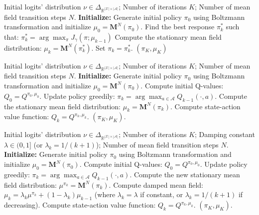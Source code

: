 \documentclass[10pt,twocolumn,letterpaper]{article}
\theoremstyle{definition}
\theoremstyle{remark}
\newcommand{\states}{\mathcal{X}}
\newcommand{\actions}{\mathcal{A}}
\begin{document}
\begin{algorithm}[H]
\small
\caption{Pure Fixed Point}
\label{algo:purefp}
\begin{algorithmic}[1]
    \REQUIRE Initial logits' distribution $\nu\in\Delta_{\mathbb{R}^{|\states|\times|\actions|}}$; Number of iterations $K$; Number of mean field transition steps $N$.
    \STATE \textbf{Initialize:} Generate initial policy $\pi_0$ using Boltzmann transformation and initialize $\mu_0=\mathbf{M}^N(\pi_0)$.
        \STATE Find the best response $\pi_k^*$ such that: $\pi_k^* = \arg\max_{\pi} J_{\gamma} (\pi;\mu_{k-1})$
        \STATE Compute the stationary mean field distribution: $\mu_k = \mathbf{M}^N(\pi^*_k)$.
        \STATE Set $\pi_k = \pi_k^*$.
    \ENDFOR
    \ENSURE $(\pi_K,\mu_K)$
\end{algorithmic}
\end{algorithm}

\begin{algorithm}[H]
\small
\caption{Policy Iteration}
\label{algo:pi}
\begin{algorithmic}[1]
    \REQUIRE Initial logits' distribution $\nu\in\Delta_{\mathbb{R}^{|\states|\times|\actions|}}$; Number of iterations $K$; Number of mean field transition steps $N$.
    \STATE \textbf{Initialize:} Generate initial policy $\pi_0$ using Boltzmann transformation and initialize $\mu_0=\mathbf{M}^N(\pi_0)$.
    \STATE Compute initial Q-values: $Q_0 = Q^{\pi_0, \mu_0}$.
        \STATE Update policy greedily: $\pi_k = \arg\max_{a \in \actions} Q_{k-1}(\cdot, a)$.
        \STATE Compute the stationary mean field distribution: $\mu_k = \mathbf{M}^N(\pi_k)$.
        \STATE Compute state-action value function: $Q_k = Q^{\pi_k, \mu_k}$.
    \ENDFOR
    \ENSURE $(\pi_K, \mu_K)$.
\end{algorithmic}
\end{algorithm}

\begin{algorithm}[H]
\small
\caption{Smooth Policy Iteration}
\label{algo:smoothpi}
\begin{algorithmic}[1]
    \REQUIRE Initial logits' distribution $\nu\in\Delta_{\mathbb{R}^{|\states|\times|\actions|}}$; Number of iterations $K$; Damping constant $\lambda \in (0,1]$ (or $\lambda_k = 1/(k+1)$); Number of mean field transition steps $N$.
    \STATE \textbf{Initialize:} Generate initial policy $\pi_0$ using Boltzmann transformation and initialize $\mu_0=\mathbf{M}^N(\pi_0)$.
    \STATE Compute initial Q-values: $Q_0 = Q^{\pi_0, \mu_0}$.
        \STATE Update policy greedily: $\pi_k = \arg\max_{a \in \actions} Q_{k-1}(\cdot, a)$.
        \STATE Compute the new stationary mean field distribution: $\mu^{\pi_k} = \mathbf{M}^N(\pi_k)$.
        \STATE Compute damped mean field: $\mu_k = \lambda_k \mu^{\pi_k} + (1-\lambda_k)\mu_{k-1}$ (where $\lambda_k = \lambda$ if constant, or $\lambda_k = 1/(k+1)$ if decreasing).
        \STATE Compute state-action value function: $Q_k = Q^{\pi_k, \mu_k}$.
    \ENDFOR
    \ENSURE $(\pi_K, \mu_K)$.
\end{algorithmic}
\end{algorithm}
\end{document}
